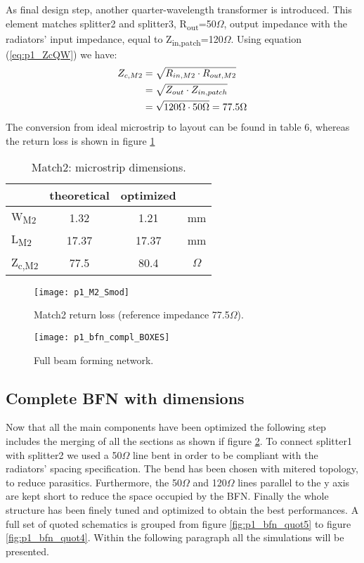 As final design step, another quarter-wavelength transformer is introduced. This element matches splitter2 and splitter3, R\textsubscript{out}=50$\Omega$, output impedance with the radiators' input impedance, equal to Z\textsubscript{in,patch}=120$\Omega$. Using equation (\ref{eq:p1_ZcQW}) we have:
\begin{align}
	Z_{c,M2}&=\sqrt{R_{in,M2}\cdot R_{out,M2}} \notag\\
	&=\sqrt{Z_{out}\cdot Z_{in,patch}} \notag\\
	&=\sqrt{120\Omega \cdot 50\Omega}=77.5\Omega \notag
\end{align}
The conversion from ideal microstrip to layout can be found in table 6, whereas the return loss is shown in figure \ref{fig:p1_M2_Smod}

\begin{table} [H]
	\label{tab:21_DimM2}
	\caption{Match2: microstrip dimensions.}
	\centering	
	\begin{tabular}{lccc} 
		\toprule
		& theoretical 			& optimized &\\
		\midrule 
		W\textsubscript{M2} 	&	1.32		&	1.21	& mm 		\\
		L\textsubscript{M2}		&	17.37		& 	17.37	& mm		\\ 
		Z\textsubscript{c,M2}	&	77.5		& 	80.4	& $\Omega$		\\
		\bottomrule
	\end{tabular}	
\end{table}

\begin{figure}[t] 
	\centering
	\texttt{[image: p1\_M2\_Smod]}
	\caption{Match2 return loss (reference impedance 77.5$\Omega$). }
	\label{fig:p1_M2_Smod}
\end{figure}
\newpage
\begin{figure}[H] 
	\centering
	\texttt{[image: p1\_bfn\_compl\_BOXES]}
	\caption{Full beam forming network. }
	\label{fig:p1_bfn_compl1}
\end{figure}

\newpage

\subsection{Complete BFN with dimensions}

Now that all the main components have been optimized the following step includes the merging of all the sections as shown if figure \ref{fig:p1_bfn_compl1}.
To connect splitter1 with splitter2 we used a 50$\Omega$ line bent in order to be compliant with the radiators' spacing specification. The bend has been chosen with mitered topology, to reduce parasitics. Furthermore, the 50$\Omega$ and 120$\Omega$ lines parallel to the y axis are kept short to reduce the space occupied by the BFN. 
Finally the whole structure has been finely tuned and optimized to obtain the best performances. A full set of quoted schematics is grouped from figure \ref{fig:p1_bfn_quot5} to figure \ref{fig:p1_bfn_quot4}. Within the following paragraph all the simulations will be presented.

